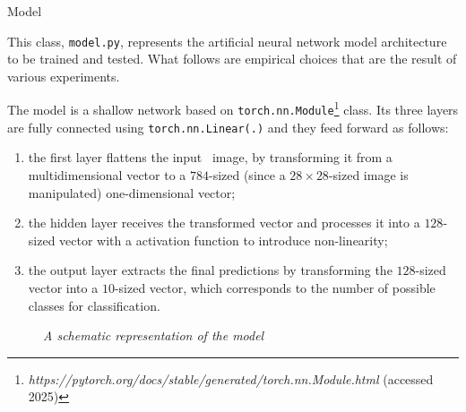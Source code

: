 \begin{section}{Model}
    \par This class, \texttt{model.py}, represents the artificial neural network model architecture to be trained and tested. What follows are empirical choices that are the result of various experiments.\\
    \par The model is a shallow network based on \texttt{torch.nn.Module}\footnote{\textit{https://pytorch.org/docs/stable/generated/torch.nn.Module.html} (accessed 2025)} class. Its three layers are fully connected using \texttt{torch.nn.Linear(.)} and they feed forward as follows:
    \begin{enumerate}
        \item the first layer flattens the input~ image, by transforming it from a multidimensional vector to a $784$-sized (since a $28 \times 28$-sized image is manipulated) one-dimensional vector;
        \item the hidden layer receives the transformed vector and processes it into a $128$-sized vector with a  activation function to introduce non-linearity;
        \item the output layer extracts the final predictions by transforming the $128$-sized vector into a $10$-sized vector, which corresponds to the number of possible classes for classification.
    \end{enumerate}
    \vspace{1cm}
    \begin{figure}[h]
        \centering
        
        \caption[A schematic representation of the model.]{\emph{A schematic representation of the model}\footnotemark}
        \label{fig:model}
    \end{figure}

\end{section}
\clearpage